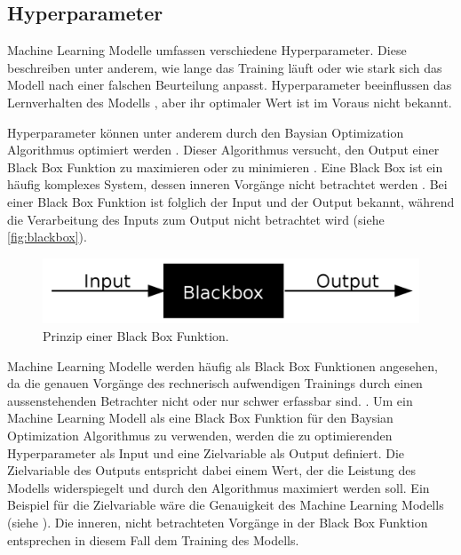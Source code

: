 \newpage
 
\subsection{Hyperparameter}\label{sub:t_ml_hyper}
Machine Learning Modelle umfassen verschiedene Hyperparameter. Diese beschreiben
unter anderem, wie lange das Training läuft oder wie stark sich das Modell nach
einer falschen Beurteilung anpasst. Hyperparameter beeinflussen das
Lernverhalten des Modells \cite{nyuytiymbiy_parameters_2022}, aber ihr
optimaler Wert ist im Voraus nicht bekannt.
 
Hyperparameter können unter anderem durch den Baysian Optimization Algorithmus
optimiert werden \cite{agnihotri_exploring_2020}\cite{paretos_bayesian_2021}.
Dieser Algorithmus versucht, den Output einer Black Box Funktion zu maximieren
oder zu minimieren \cite[S. 15]{garnett_bayesian_nodate}. Eine Black Box ist ein
häufig komplexes System, dessen inneren Vorgänge nicht betrachtet werden
\cite{noauthor_black_2021}. Bei einer Black Box Funktion ist folglich der Input
und der Output bekannt, während die Verarbeitung des Inputs zum Output nicht
betrachtet wird (siehe \autoref{fig:blackbox}).
 
\begin{figure}[!ht]
   \centering
   \includegraphics[width=\textwidth-2cm]{images/theorie/blackbox.png}
   \caption{Prinzip einer Black Box Funktion. \cite{noauthor_black_2021}}\label{fig:blackbox}
\end{figure}
 
Machine Learning Modelle werden häufig als Black Box Funktionen angesehen, da
die genauen Vorgänge des rechnerisch aufwendigen Trainings durch einen
aussenstehenden Betrachter nicht oder nur schwer erfassbar sind.
\cite{robbins_machine_2017}. Um ein Machine Learning Modell als eine Black Box
Funktion für den Baysian Optimization Algorithmus zu verwenden, werden die zu
optimierenden Hyperparameter als Input und eine Zielvariable als Output
definiert. Die Zielvariable des Outputs entspricht dabei einem Wert, der die
Leistung des Modells widerspiegelt und durch den Algorithmus maximiert werden
soll. Ein Beispiel für die Zielvariable wäre die Genauigkeit des Machine Learning
Modells (siehe ). Die inneren, nicht betrachteten
Vorgänge in der Black Box Funktion entsprechen in diesem Fall dem Training des
Modells.
 
